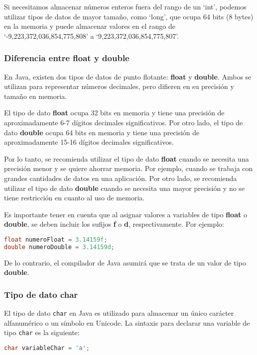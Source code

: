 \documentclass{article}
\begin{document}
Si necesitamos almacenar números enteros fuera del rango de un \enquote*{int}, podemos utilizar tipos de datos de mayor tamaño, como \enquote*{long}, que ocupa 64 bits (8 bytes) en la memoria y puede almacenar valores en el rango de \enquote*{-9,223,372,036,854,775,808} a \enquote*{9,223,372,036,854,775,807}.

\subsubsection*{Diferencia entre float y double}
En Java, existen dos tipos de datos de punto flotante: \textbf{float} y \textbf{double}. Ambos se utilizan para representar números decimales, pero difieren en su precisión y tamaño en memoria.

El tipo de dato \textbf{float} ocupa 32 bits en memoria y tiene una precisión de aproximadamente 6-7 dígitos decimales significativos. Por otro lado, el tipo de dato \textbf{double} ocupa 64 bits en memoria y tiene una precisión de aproximadamente 15-16 dígitos decimales significativos.

Por lo tanto, se recomienda utilizar el tipo de dato \textbf{float} cuando se necesita una precisión menor y se quiere ahorrar memoria. Por ejemplo, cuando se trabaja con grandes cantidades de datos en una aplicación. Por otro lado, se recomienda utilizar el tipo de dato \textbf{double} cuando se necesita una mayor precisión y no se tiene restricción en cuanto al uso de memoria.

Es importante tener en cuenta que al asignar valores a variables de tipo \textbf{float} o \textbf{double}, se deben incluir los sufijos \textbf{f} o \textbf{d}, respectivamente. Por ejemplo:

\begin{lstlisting}[language=Java]
float numeroFloat = 3.14159f;
double numeroDouble = 3.14159d;
\end{lstlisting}

De lo contrario, el compilador de Java asumirá que se trata de un valor de tipo \textbf{double}.

\subsubsection*{Tipo de dato char}
El tipo de dato \lstinline{char} en Java es utilizado para almacenar un único carácter alfanumérico o un símbolo en Unicode. La sintaxis para declarar una variable de tipo \lstinline{char} es la siguiente:

\begin{lstlisting}[language=Java]
char variableChar = 'a';
\end{lstlisting}
\end{document}
